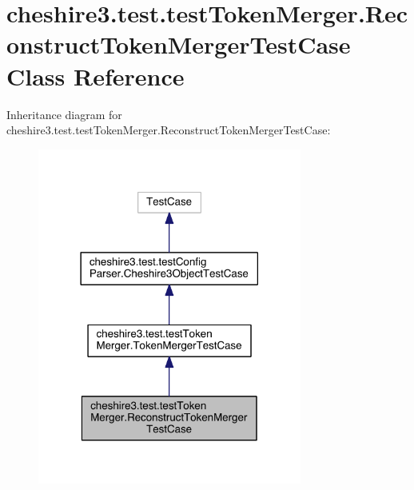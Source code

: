 \hypertarget{classcheshire3_1_1test_1_1test_token_merger_1_1_reconstruct_token_merger_test_case}{\section{cheshire3.\-test.\-test\-Token\-Merger.\-Reconstruct\-Token\-Merger\-Test\-Case Class Reference}
\label{classcheshire3_1_1test_1_1test_token_merger_1_1_reconstruct_token_merger_test_case}
}


Inheritance diagram for cheshire3.\-test.\-test\-Token\-Merger.\-Reconstruct\-Token\-Merger\-Test\-Case\-:
\nopagebreak
\begin{figure}[H]
\begin{center}
\leavevmode
\includegraphics[width=246pt]{classcheshire3_1_1test_1_1test_token_merger_1_1_reconstruct_token_merger_test_case__inherit__graph}
\end{center}
\end{figure}


